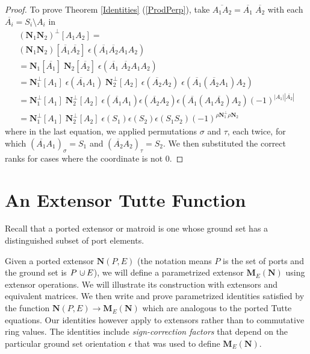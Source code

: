\documentclass[12pt]{article}
\theoremstyle{definition}
\newcommand{\dunion}
{\mbox{\hbox{\hskip6pt$\cdot$\hskip-5.50pt$\cup$\hskip2pt}}}
\newcommand{\scomp}[1]{\ensuremath{\overline{#1}}}
\newcommand{\Card}[1]{\ensuremath{{\left|#1\right|}}}
\newcommand{\ext}[1]{\ensuremath{\mathbf{#1}}}
\begin{document}
\begin{proof}
To prove Theorem \ref{Identities} (\ref{ProdPerp}), take
$\scomp{A_1A_2}=\scomp{A_1}\;\scomp{A_2}$ with each 
$\scomp{A_i}=S_i\setminus A_i$ in
\begin{equation*}
\begin{split}
(\ext{N}_1 \ext{N}_2)^\perp[A_1 A_2]=\\
(\ext{N}_1 \ext{N}_2)[\scomp{A_1} \scomp{A_2}]\;
  \epsilon(\scomp{A_1} \scomp{A_2} A_1 A_2 )\\
=\ext{N}_1[\scomp{A_1}]\; \ext{N}_2 [\scomp{A_2}]\;
  \epsilon(\scomp{A_1}\;\scomp{A_2} A_1 A_2 )\\
=\ext{N}_1^\perp[A_1]\; \epsilon(\scomp{A_1}A_1)\;
 \ext{N}_2^\perp[A_2]\; \epsilon(\scomp{A_2}A_2)\;
  \epsilon(\scomp{A_1} (\scomp{A_2} A_1) A_2 )\\
=\ext{N}_1^\perp[A_1]\;  \ext{N}_2^\perp[A_2]\;
  \epsilon(\scomp{A_1}A_1)\epsilon(\scomp{A_2} A_2)
  \epsilon(\scomp{A_1} (A_1 \scomp{A_2})  A_2 )
  (-1)^{\Card{A_1}\Card{\scomp{A_2}}}\\
=\ext{N}_1^\perp[A_1]\;  \ext{N}_2^\perp[A_2]\;
  \epsilon(S_1)\epsilon(S_2)
  \epsilon(S_1 S_2)
  (-1)^{\rho\ext{N}_1^\perp\rho\ext{N}_2}
\end{split}
\end{equation*}
where in the last equation, we applied permutations $\sigma$
and $\tau$, each twice, for which $(\scomp{A_1}A_1)_\sigma=S_1$
and $(\scomp{A_2}A_2)_\tau=S_2$.  We then substituted the 
correct ranks for cases where the coordinate is not 0.
\end{proof}


\section{An  Extensor Tutte Function}
\label{Extensors}

Recall that a ported extensor or matroid is one whose ground set
has a distinguished subset of port elements.

Given a ported extensor $\ext{N}(P,E)$ (the notation means $P$ is
the set of ports and the ground set is $P\dunion E$), 
we will define a parametrized extensor $\ext{M}_E(\ext{N})$ 
using extensor operations.  We will illustrate its construction
with extensors and equivalent matrices.
We then write and prove
parametrized identities
satisfied by the function $\ext{N}(P,E)\rightarrow \ext{M}_E(\ext{N})$ which 
are analogous to the
ported Tutte equations.  
Our identities however apply to extensors rather than to commutative ring
values.  The identities include
\textit{sign-correction factors} that depend on the particular ground set
orientation $\epsilon$ that was used to define 
$\ext{M}_E(\ext{N})$.  
\end{document}
